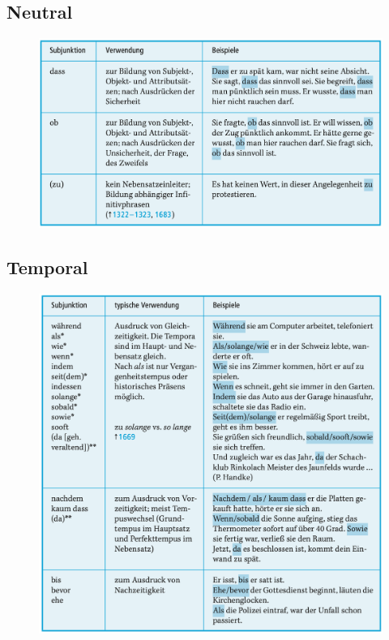 \documentclass[UTF8]{report}
\begin{document}
\subsection{Neutral}
\begin{figure}[H]
    \centering
    \includegraphics[scale=0.55]{nu.png}
\end{figure}

\subsection{Temporal}
\begin{figure}[H]
    \centering
    \includegraphics[scale=0.6]{tem.png}
\end{figure}
\end{document}
